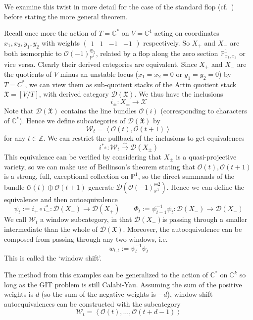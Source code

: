 We examine this twist in more detail for the case of the standard flop (cf.~\cite{donovan_window_2014}) before stating the more general theorem. 

Recall once more the action of $T = \mathbb{C}^*$ on $V = \mathbb{C}^4$  acting on coordinates $x_{1}, x_{2}, y_{1},y_{2}$ with weights $\begin{pmatrix}1&1&-1&-1\end{pmatrix}$ respectively. So $X_+$ and $X_-$ are both isomorphic to $\mathcal{O}(-1)_{\mathbb{P}^1}^{\oplus_{2}}$, related by a flop along the zero section $\mathbb{P}^1_{x_{1},x_{2}}$ or vice versa. Clearly their derived categories are equivalent. Since $X_+$ and $X_-$ are the quotients of $V$ minus an unstable locus ($x_{1}= x_{2}= 0$ or $y_{1}= y_{2}=0$)  by $T = C^{*}$, we can view them as sub-quotient stacks of the Artin quotient stack $\mathfrak{X}=[V/T]$, with derived category $\mathcal{D}(\mathfrak{X})$. We thus have the inclusions $$
i_{\pm}: X_{\pm}\to \mathcal{X}
$$
Note that $\mathcal{D}(\mathfrak{X})$ contains the line bundles $\mathcal{O}(i)$ (corresponding to characters of $\mathbb{C}^*$).  Hence we define subcategories of $\mathcal{D}(\mathfrak{X})$ by $$
 \mathcal{W}_{t}= \left< \mathcal{O}(t), \mathcal{O}(t+1) \right> 
$$ for any $t \in \mathbb{Z}$. We can restrict the pullback of the inclusions to get equivalences $$
i^{*_{\pm}}:\mathcal{W}_{t} \xrightarrow{\sim} \mathcal{D}(X_{\pm})
$$
This equivalence can be verified by considering that $X_\pm$ is a quasi-projective variety, so we can make use of Beilinson's theorem stating that $\mathcal{O}(t), \mathcal{O}(t+1)$ is a strong, full, exceptional collection on $\mathbb{P}^1$, so the direct summands of the bundle $\mathcal{O}(t)\oplus \mathcal{O}(t+1)$ generate  $\mathcal{D}(\mathcal{O}(-1)_{\mathbb{P}^{1}}^{\oplus {2}})$.  Hence we can define the equivalence and then autoequivalence $$
\psi_{t}:= i_{+}\circ i_{-}^{*}: \mathcal{D}(X_{-})\to \mathcal{D}(X_{+}) \qquad \Phi_{t}:= \psi_{t-1}^{-1}\psi_{t}: \mathcal{D}(X_{-})\to \mathcal{D}(X_{-})
$$
We call $\mathcal{W}_t$ a window subcategory, in that $\mathcal{D}(X_{-})$is passing through a smaller intermediate than the whole of $\mathcal{D}(\mathfrak{X})$. Moreover, the autoequivalence can be composed from passing through any two windows, i.e. $$
w_{l,t}:= \psi_{l}^{-1}\psi_t
$$
This is called the `window shift'. 

\begin{remark}{}{}
	The method from this examples can be generalized to the action of $\mathbb{C}^*$ on $\mathbb{C}^k$ so long as the GIT problem is still Calabi-Yau. Assuming the sum of the positive weights is $d$ (so the sum of the negative weights is $-d$), window shift autoequivalences can be constructed with the subcategory $$\mathcal{W}_{t}= \left< \mathcal{O}(t),\dots, \mathcal{O}(t+d-1) \right> $$
\end{remark}


